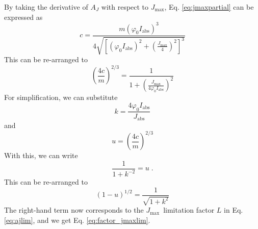 \documentclass[gmd, manuscript]{copernicus}
\newcommand{\jmax}{$J_{\text{max}}$}
\begin{document}
By taking the derivative of $A_J$ with respect to \jmax , Eq. \ref{eq:jmaxpartial} can be expressed as
\begin{equation}
    c = \frac{ m (\varphi_0 I_\text{abs})^3}{ 4 \sqrt{ \left[ (\varphi_0 I_\text{abs})^2 + (\frac{J_\text{max}}{4})^2 \right]^3 }}
\end{equation}
This can be re-arranged to
\begin{equation}
    \left(\frac{4c}{m}\right)^{2/3} = \frac{1}{1 + \left( \frac{J_\text{max}}{4\varphi_0 I_\text{abs}}\right)^2}
\end{equation}
For simplification, we can substitute 
\begin{equation}
    k = \frac{4 \varphi_0 I_\text{abs}}{J_\text{abs}}
\end{equation}
and 
\begin{equation}
    u = \left(\frac{4c}{m}\right)^{2/3}
\end{equation}
With this, we can write
\begin{equation}
    \frac{1}{1+k^{-2}} = u \;.
\end{equation}
This can be re-arranged to 
\begin{equation}
    (1-u)^{1/2} = \frac{1}{\sqrt{1+k^2}} 
\end{equation}
The right-hand term now corresponds to the \jmax\ limitation factor $L$ in Eq. \ref{eq:ajlim}, and we get Eq. \ref{eq:factor_jmaxlim}.
\end{document}
